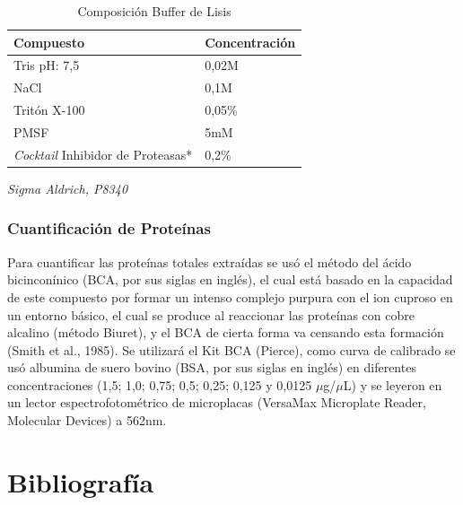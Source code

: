 \documentclass[12pt,a4paper,]{article}
\begin{document}
\begin{table}[h!]
\sffamily
  \begin{center}
    \begin{threeparttable}
      \caption{Composición Buffer de Lisis}\label{tablabufferlisis}
      \begin{tabularx}{10cm}{X l}
    \toprule
    \textbf{Compuesto} & \textbf{Concentración} \\
    \midrule
    Tris pH: 7,5 & 0,02M \\
    NaCl & 0,1M \\
    Tritón X-100 & 0,05\% \\
    PMSF & 5mM \\
    \emph{Cocktail} Inhibidor de Proteasas* & 0,2\% \\
\bottomrule
\end{tabularx}
\begin{tablenotes}
  \item *\emph{Sigma Aldrich, P8340}
\end{tablenotes}
\end{threeparttable}
\end{center}
\end{table}

\subsubsection{Cuantificación de
Proteínas}\label{cuantificaciuxf3n-de-proteuxednas}

Para cuantificar las proteínas totales extraídas se usó el método del
ácido bicinconínico (BCA, por sus siglas en inglés), el cual está basado
en la capacidad de este compuesto por formar un intenso complejo purpura
con el ion cuproso en un entorno básico, el cual se produce al
reaccionar las proteínas con cobre alcalino (método Biuret), y el BCA de
cierta forma va censando esta formación (Smith et al., 1985). Se
utilizará el Kit BCA (Pierce), como curva de calibrado se usó albumina
de suero bovino (BSA, por sus siglas en inglés) en diferentes
concentraciones (1,5; 1,0; 0,75; 0,5; 0,25; 0,125 y 0,0125
$\mu$g/$\mu$L) y se leyeron en un lector espectrofotométrico de
microplacas (VersaMax Microplate Reader, Molecular Devices) a 562nm.

\clearpage

\section*{Bibliografía}\label{bibliografuxeda}
\end{document}
